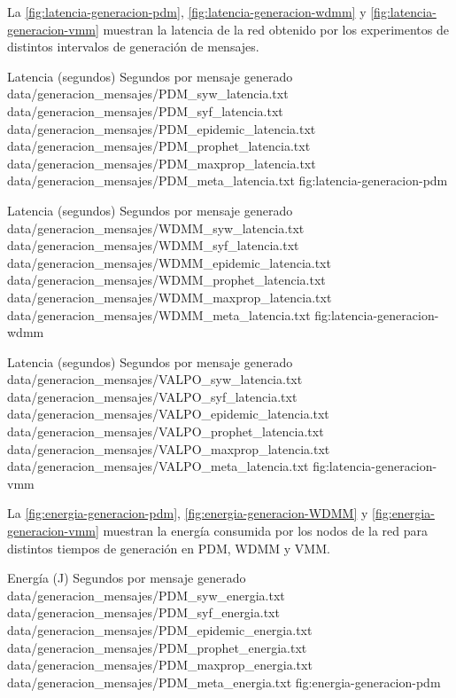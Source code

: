 La \ref{fig:latencia-generacion-pdm}, 
\ref{fig:latencia-generacion-wdmm} y
\ref{fig:latencia-generacion-vmm} muestran la latencia de la red obtenido por
los experimentos de distintos intervalos de generación de mensajes.


{
\graficoProtocolos
{Latencia (segundos)}
{Segundos por mensaje generado}
{data/generacion_mensajes/PDM_syw_latencia.txt}
{data/generacion_mensajes/PDM_syf_latencia.txt}
{data/generacion_mensajes/PDM_epidemic_latencia.txt}
{data/generacion_mensajes/PDM_prophet_latencia.txt}
{data/generacion_mensajes/PDM_maxprop_latencia.txt}
{data/generacion_mensajes/PDM_meta_latencia.txt}
}{fig:latencia-generacion-pdm}


{
\graficoProtocolos
{Latencia (segundos)}
{Segundos por mensaje generado}
{data/generacion_mensajes/WDMM_syw_latencia.txt}
{data/generacion_mensajes/WDMM_syf_latencia.txt}
{data/generacion_mensajes/WDMM_epidemic_latencia.txt}
{data/generacion_mensajes/WDMM_prophet_latencia.txt}
{data/generacion_mensajes/WDMM_maxprop_latencia.txt}
{data/generacion_mensajes/WDMM_meta_latencia.txt}
}{fig:latencia-generacion-wdmm}


{
\graficoProtocolos
{Latencia (segundos)}
{Segundos por mensaje generado}
{data/generacion_mensajes/VALPO_syw_latencia.txt}
{data/generacion_mensajes/VALPO_syf_latencia.txt}
{data/generacion_mensajes/VALPO_epidemic_latencia.txt}
{data/generacion_mensajes/VALPO_prophet_latencia.txt}
{data/generacion_mensajes/VALPO_maxprop_latencia.txt}
{data/generacion_mensajes/VALPO_meta_latencia.txt}
}{fig:latencia-generacion-vmm}




La \ref{fig:energia-generacion-pdm}, 
\ref{fig:energia-generacion-WDMM} y
\ref{fig:energia-generacion-vmm} muestran la energía consumida por los nodos de
la red para distintos tiempos de generación en PDM, WDMM y VMM.




{
\graficoProtocolos
{Energía (J)}
{Segundos por mensaje generado} 
{data/generacion_mensajes/PDM_syw_energia.txt}
{data/generacion_mensajes/PDM_syf_energia.txt}
{data/generacion_mensajes/PDM_epidemic_energia.txt}
{data/generacion_mensajes/PDM_prophet_energia.txt}
{data/generacion_mensajes/PDM_maxprop_energia.txt}
{data/generacion_mensajes/PDM_meta_energia.txt}
}{fig:energia-generacion-pdm}



